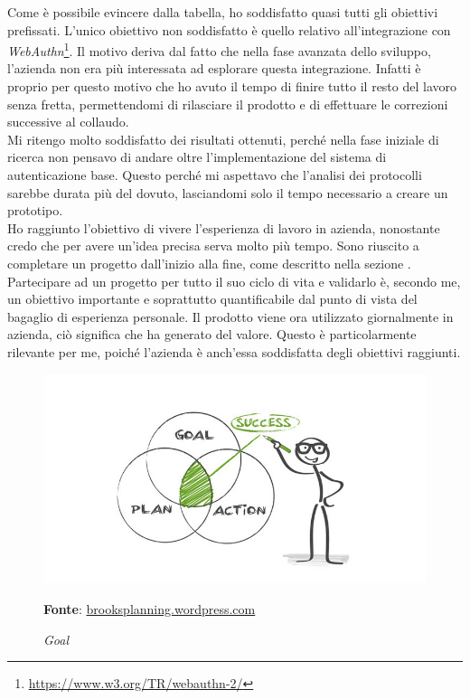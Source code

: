 Come è possibile evincere dalla tabella, ho soddisfatto quasi tutti gli obiettivi prefissati. L'unico obiettivo non soddisfatto è quello relativo all'integrazione con \textit{WebAuthn}\footnote{\url{https://www.w3.org/TR/webauthn-2/}}. Il motivo deriva dal fatto che nella fase avanzata dello sviluppo, l'azienda non era più interessata ad esplorare questa integrazione. Infatti è proprio per questo motivo che ho avuto il tempo di finire tutto il resto del lavoro senza fretta, permettendomi di rilasciare il prodotto e di effettuare le correzioni successive al collaudo. \\
Mi ritengo molto soddisfatto dei risultati ottenuti, perché nella fase iniziale di ricerca non pensavo di andare oltre l'implementazione del sistema di autenticazione base. Questo perché mi aspettavo che l'analisi dei protocolli sarebbe durata più del dovuto, lasciandomi solo il tempo necessario a creare un prototipo. \\
Ho raggiunto l'obiettivo di vivere l'esperienza di lavoro in azienda, nonostante credo che per avere un'idea precisa serva molto più tempo.
Sono riuscito a completare un progetto dall'inizio alla fine, come descritto nella sezione . Partecipare ad un progetto per tutto il suo ciclo di vita e validarlo è, secondo me, un obiettivo importante e soprattutto quantificabile dal punto di vista del bagaglio di esperienza personale.
Il prodotto viene ora utilizzato giornalmente in azienda, ciò significa che ha generato del valore. Questo è particolarmente rilevante per me, poiché l'azienda è anch'essa soddisfatta degli obiettivi raggiunti.

    \begin{figure}[ht]
        \centering
        \includegraphics[width=1\textwidth]{immagini/success.jpg}
        \caption{\textit{Goal}}
        \textbf{Fonte}:
        \href{https://brooksplanning.wordpress.com/2016/06/12/action-plan-for-success/
}{brooksplanning.wordpress.com}
        \label{fig: Goal}
    \end{figure}

